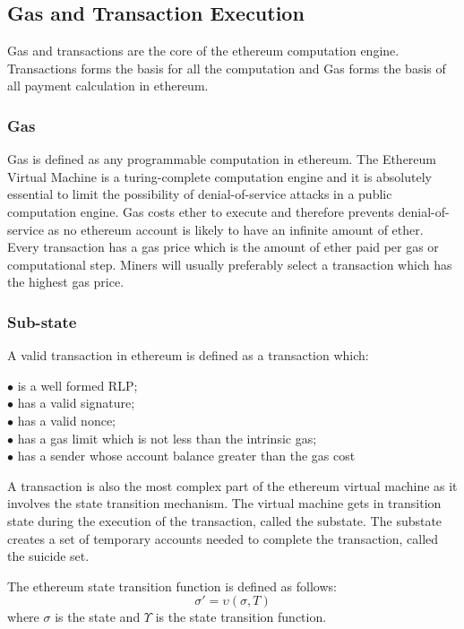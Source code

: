 \documentclass[a4paper,twoside,phd]{BYUPhys}
\begin{document}
\subsection{Gas and Transaction Execution}
Gas and transactions are the core of the ethereum computation engine. Transactions forms the basis for all the computation and Gas forms the basis of all payment calculation in ethereum.
\subsubsection{Gas}
Gas is defined as any programmable computation in ethereum. The Ethereum Virtual Machine is a turing-complete computation engine and it is absolutely essential to limit the possibility of denial-of-service attacks in a public computation engine. Gas costs ether to execute and therefore prevents denial-of-service as no ethereum account is likely to have an infinite amount of ether. Every transaction has a gas price which is the amount of ether paid per gas or computational step. Miners will usually preferably select a transaction which has the highest gas price.
\subsubsection{Sub-state}
A valid transaction in ethereum is defined as a transaction which:
\begin{description}
\item [$\bullet$ is a well formed RLP;]
\item [$\bullet$ has a valid signature;]
\item [$\bullet$ has a valid nonce;]
\item [$\bullet$ has a gas limit which is not less than the intrinsic gas;]
\item [$\bullet$ has a sender whose account balance greater than the gas cost]
\end{description}

A transaction is also the most complex part of the ethereum virtual machine as it involves the state transition mechanism. The virtual machine gets in transition state during the execution of the transaction, called the substate. The substate creates a set of temporary accounts needed to complete the transaction, called the suicide set.

The ethereum state transition function is defined as follows: \[\sigma' = \upsilon(\sigma, T)\]
where $\sigma$ is the state and $\Upsilon$ is the state transition function.
\end{document}
